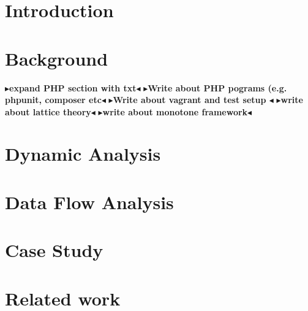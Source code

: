 \documentclass[twoside,11pt,openright]{report}
\theoremstyle{definition}
\newcommand{\todo}[1]{{\color[rgb]{.5,0,0}\textbf{$\blacktriangleright$#1$\blacktriangleleft$}}}
\begin{document}
\chapter{Introduction}
\label{ch:intro}


\chapter{Background}
\label{ch:background}

\todo{expand PHP section with txt}
\todo{Write about PHP pograms (e.g. phpunit, composer etc}
\todo{Write about vagrant and test setup }
\todo{write about lattice theory}
\todo{write about monotone framework}

\chapter{Dynamic Analysis}
\label{ch:study}



\chapter{Data Flow Analysis}
\label{ch:analysis}
%











\chapter{Case Study}
\label{ch:evaluation}



\chapter{Related work}
\label{ch:relatedWork}

\end{document}
